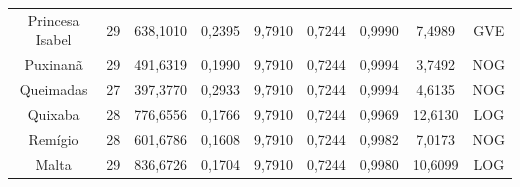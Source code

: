 \begin{table}[ht]
\begin{tabular}{ccccccccc}
Princesa Isabel & 29 & 638,1010 & 0,2395 & 9,7910 & 0,7244 & 0,9990 & 7,4989 & GVE \\
Puxinanã & 29 & 491,6319 & 0,1990 & 9,7910 & 0,7244 & 0,9994 & 3,7492 & NOG \\
Queimadas & 27 & 397,3770 & 0,2933 & 9,7910 & 0,7244 & 0,9994 & 4,6135 & NOG \\
Quixaba & 28 & 776,6556 & 0,1766 & 9,7910 & 0,7244 & 0,9969 & 12,6130 & LOG \\
Remígio & 28 & 601,6786 & 0,1608 & 9,7910 & 0,7244 & 0,9982 & 7,0173 & NOG \\ 
Malta & 29 & 836,6726 & 0,1704 & 9,7910 & 0,7244 & 0,9980 & 10,6099 & LOG \\ \hline
\end{tabular}
\end{table}

\newpage


